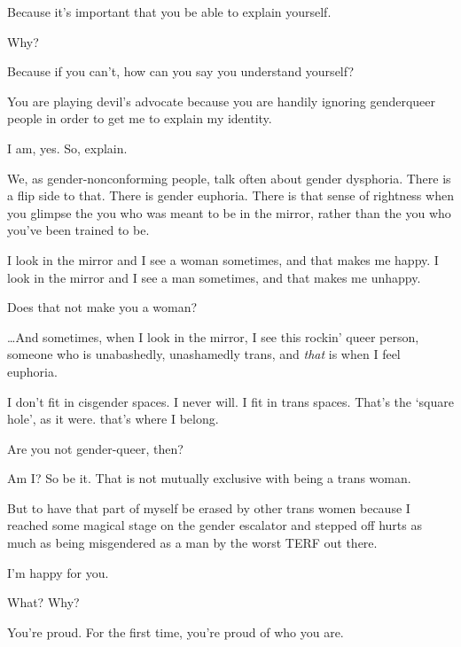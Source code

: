 \begin{paracol}{2}
\begin{leftcolumn}
\begin{ally}
Because it's important that you be able to explain yourself.
\end{ally}
Why?

\begin{ally}
Because if you can't, how can you say you understand yourself?
\end{ally}
\newpage

\noindent You are playing devil's advocate because you are handily ignoring genderqueer people in order to get me to explain my identity.

\begin{ally}
I am, yes. So, explain.
\end{ally}
We, as gender-nonconforming people, talk often about gender dysphoria. There is a flip side to that. There is gender euphoria. There is that sense of rightness when you glimpse the you who was meant to be in the mirror, rather than the you who you've been trained to be.

I look in the mirror and I see a woman sometimes, and that makes me happy. I look in the mirror and I see a man sometimes, and that makes me unhappy.

\begin{ally}
Does that not make you a woman?
\end{ally}
\ldots{}And sometimes, when I look in the mirror, I see this rockin' queer person, someone who is unabashedly, unashamedly trans, and \emph{that} is when I feel euphoria.

I don't fit in cisgender spaces. I never will. I fit in trans spaces. That's the `square hole', as it were. that's where I belong.

\begin{ally}
Are you not gender-queer, then?
\end{ally}
Am I? So be it. That is not mutually exclusive with being a trans woman.

But to have that part of myself be erased by other trans women because I reached some magical stage on the gender escalator and stepped off hurts as much as being misgendered as a man by the worst TERF out there.
\newpage
\null
\thispagestyle{empty}
\newpage
\null
\vfill
\begin{ally}
I'm happy for you.
\end{ally}
What? Why?

\begin{ally}
You're proud. For the first time, you're proud of who you are.
\end{ally}
\vfill
{}
\newpage
\end{leftcolumn}
\end{paracol}
